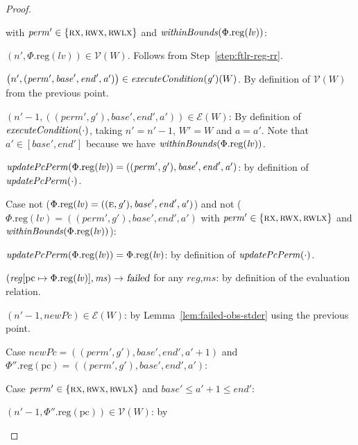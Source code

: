 \documentclass[a4paper]{article}
\newcommand{\update}[2]{[#1 \mapsto #2]}
\newcommand{\var}[1]{\mathit{#1}}
\newcommand{\hs}{\var{ms}}
\newcommand{\ms}{\hs}
\newcommand{\lv}{\var{lv}}
\newcommand{\gl}{\var{g}}
\newcommand{\pcreg}{\mathrm{pc}}
\newcommand{\addr}{\var{a}}
\newcommand{\start}{\var{base}}
\newcommand{\addrend}{\var{end}}
\newcommand{\reg}{\var{reg}}
\newcommand{\perm}{\var{perm}}
\newcommand{\plainproj}[1]{\mathrm{#1}}
\newcommand{\memreg}[1][\Phi]{#1.\plainproj{reg}}
\newcommand{\failed}{\textsl{failed}}
\newcommand{\plainfun}[2]{
  \ifthenelse{\equal{#2}{}}
  {\mathit{#1}}
  {\mathit{#1}(#2)}
}
\newcommand{\updatePcPerm}[1]{\plainfun{updatePcPerm}{#1}}
\newcommand{\withinBounds}[1]{\plainfun{withinBounds}{#1}}
\newcommand{\execCond}[1]{\plainfun{executeCondition}{#1}}
\newcommand{\asmType}{\plaindom{AsmType}}
\newcommand{\plaindom}[1]{\mathrm{#1}}
\newcommand{\intr}[2]{\mathcal{#1}}
\newcommand{\valueintr}[1]{\intr{V}{#1}}
\newcommand{\exprintr}[1]{\intr{E}{#1}}
\newcommand{\stdvr}{\valueintr{\asmType}}
\newcommand{\stder}{\exprintr{\asmType}}
\newcommand{\npair}[2][n]{\left(#1,#2 \right)}
\newcommand{\plainperm}[1]{\textsc{#1}}
\newcommand{\exec}{\plainperm{rx}}
\newcommand{\entry}{\plainperm{e}}
\newcommand{\rwx}{\plainperm{rwx}}
\newcommand{\rwlx}{\plainperm{rwlx}}
\newcommand{\step}[1][]{\rightarrow_{#1}}
\begin{document}
\begin{proof}
\begin{enumproof}
\begin{enumproof}
\begin{enumproof}
\begin{enumproof}
          with $\perm' \in \{\exec,\rwx,\rwlx\}$ and $\withinBounds{\memreg(\lv)}$:
          \begin{enumproof}
          \item $\npair[n']{\memreg(\lv)} \in \stdvr(W)$.  Follows from
            Step~\ref{step:ftlr-reg-rr}.
          \item $\npair[n']{(\perm',\start',\addrend',\addr')} \in \execCond{\gl'}(W)$.
            By definition of $\stdvr(W)$ from the previous point.
          \item $\npair[n'-1]{((\perm',\gl'),\start',\addrend',\addr')} \in
            \stder(W)$: By definition of $\execCond{\cdot}$, taking $n' = n'-1$,
            $W' = W$ and $\addr = \addr'$. Note that $\addr' \in
            [\start',\addrend']$ because we have $\withinBounds{\memreg(\lv)}$.
          \item $\updatePcPerm{\memreg(\lv)} =
            ((\perm',\gl'),\start',\addrend',\addr')$: by definition of
            $\updatePcPerm{\cdot}$.
          \end{enumproof}
        \item Case not ($\memreg(\lv) =
          ((\entry,\gl'),\start',\addrend',\addr')$) and not ($\memreg(\lv) =
          ((\perm',\gl'),\start',\addrend',\addr')$ with $\perm' \in
          \{\exec,\rwx,\rwlx\}$ and $\withinBounds{\memreg(\lv)}$):
          \begin{enumproof}
          \item $\updatePcPerm{\memreg(\lv)} = \memreg(\lv)$: by definition of 
            $\updatePcPerm{\cdot}$.
          \item $(\reg\update{\pcreg}{\memreg(\lv)},\ms)\step\failed$ for any
            $\reg$,$\ms$: by definition of the evaluation relation.
          \item $\npair[n'-1]{\var{newPc}} \in \stder(W)$: by
            Lemma~\ref{lem:failed-obs-stder} using the previous point.
          \end{enumproof}
        \end{enumproof}
      \item Case $\var{newPc} = ((\perm',\gl'),\start',\addrend',\addr' + 1)$ and
        $\memreg[\Phi''](\pcreg) = ((\perm',\gl'),\start',\addrend',\addr')$:
        \begin{enumproof}
        \item Case $\perm' \in \{\exec,\rwx,\rwlx\}$ and $\start'\leq
          \addr'+1\leq \addrend'$:
          \begin{enumproof}
          \item $\npair[n'-1]{\memreg[\Phi''](\pcreg)} \in \stdvr(W)$: by

\end{enumproof}
\end{enumproof}
\end{enumproof}
\end{enumproof}
\end{enumproof}
\end{proof}
\end{document}
